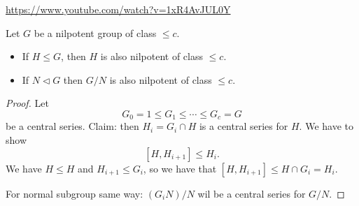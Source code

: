 \url{https://www.youtube.com/watch?v=1xR4AvJUL0Y}



\begin{lemma}
    Let $G$ be a nilpotent group of class $\le c$.
    \begin{itemize}
        \item If $H\le G$, then $H$ is also nilpotent of class $\le c$.
        \item If $N \triangleleft G$ then $G / N$ is also nilpotent of class  $\le c$.
    \end{itemize}
\end{lemma}
\begin{proof}
    Let
    \[
    G_0 = 1 \le  G_1 \le  \cdots \le  G_c = G
    \] 
    be a central series.
    Claim: then  $H_i = G_i \cap H$ is a central series for $H$.
    We have to show
    \[
        [H, H_{i+1}] \le  H_i
    .\] 
    We have $H \le  H$ and $H_{i+1} \le G_i$, so we have that  $[H, H_{i+1}] \le H \cap G_i = H_i$.

    \hr

    For normal subgroup same way: $ (G_i N) / N$ wil be a central series for $G / N$.
\end{proof}

